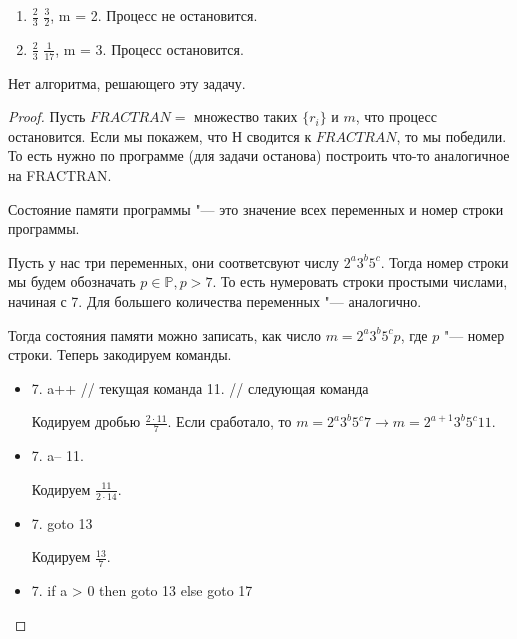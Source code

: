 \begin{exmp}
	\hfill
	\begin{enumerate}
		\item $\frac{2}{3}$ $\frac{3}{2}$, m = 2. Процесс не остановится.
		\item $\frac{2}{3}$ $\frac{1}{17}$, m = 3. Процесс остановится.
	\end{enumerate}
\end{exmp}

\begin{assertion}
	Нет алгоритма, решающего эту задачу.
\end{assertion}
\begin{proof}
	Пусть $FRACTRAN =$ множество таких $\{r_i\}$ и $m$, что процесс остановится.
	Если мы покажем, что $Н$ сводится к $FRACTRAN$, то мы победили.
	То есть нужно по программе (для задачи останова) построить что-то аналогичное на FRACTRAN.

	\begin{Def}
		Состояние памяти программы "--- это значение всех переменных и номер строки программы.
	\end{Def}

	Пусть у нас три переменных, они соответсвуют числу $2^a3^b5^c$.
	Тогда номер строки мы будем обозначать $p \in \mathbb{P}, p > 7$.
	То есть нумеровать строки простыми числами, начиная с 7.
	Для большего количества переменных "--- аналогично.

	Тогда состояния памяти можно записать, как число $m = 2^a3^b5^cp$, где $p$ "--- номер строки.
	Теперь закодируем команды.

	\begin{itemize}
		\item
\begin{abstractcode}
7.  a++ // текущая команда
11.     // следующая команда
\end{abstractcode}
			Кодируем дробью $\frac{2\cdot 11}{7}$.
			Если сработало, то $m = 2^a3^b5^c7 \rightarrow m = 2^{a + 1}3^b5^c11$.
		
		\item
\begin{abstractcode}
7.  a--
11.
\end{abstractcode}
			Кодируем $\frac{11}{2\cdot 14}$.
		
		\item
\begin{abstractcode}
7. goto 13
\end{abstractcode}
Кодируем $\frac{13}{7}$.

		\item 
\begin{abstractcode}
7. if a > 0 then goto 13 else goto 17
\end{abstractcode}


\end{itemize}
\end{proof}
